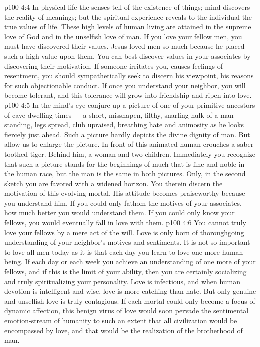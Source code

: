 \vs p100 4:4 \pc In physical life the senses tell of the existence of things; mind discovers the reality of meanings; but the spiritual experience reveals to the individual the true values of life. These high levels of human living are attained in the supreme love of God and in the unselfish love of man. If you love your fellow men, you must have discovered their values. Jesus loved men so much because he placed such a high value upon them. You can best discover values in your associates by discovering their motivation. If someone irritates you, causes feelings of resentment, you should sympathetically seek to discern his viewpoint, his reasons for such objectionable conduct. If once you understand your neighbor, you will become tolerant, and this tolerance will grow into friendship and ripen into love.
\vs p100 4:5 In the mind’s eye conjure up a picture of one of your primitive ancestors of cave\hyp{}dwelling times --- a short, misshapen, filthy, snarling hulk of a man standing, legs spread, club upraised, breathing hate and animosity as he looks fiercely just ahead. Such a picture hardly depicts the divine dignity of man. But allow us to enlarge the picture. In front of this animated human crouches a saber\hyp{}toothed tiger. Behind him, a woman and two children. Immediately you recognize that such a picture stands for the beginnings of much that is fine and noble in the human race, but the man is the same in both pictures. Only, in the second sketch you are favored with a widened horizon. You therein discern the motivation of this evolving mortal. His attitude becomes praiseworthy because you understand him. If you could only fathom the motives of your associates, how much better you would understand them. If you could only know your fellows, you would eventually fall in love with them.
\vs p100 4:6 You cannot truly love your fellows by a mere act of the will. Love is only born of thoroughgoing understanding of your neighbor’s motives and sentiments. It is not so important to love all men today as it is that each day you learn to love one more human being. If each day or each week you achieve an understanding of one more of your fellows, and if this is the limit of your ability, then you are certainly socializing and truly spiritualizing your personality. Love is infectious, and when human devotion is intelligent and wise, love is more catching than hate. But only genuine and unselfish love is truly contagious. If each mortal could only become a focus of dynamic affection, this benign virus of love would soon pervade the sentimental emotion\hyp{}stream of humanity to such an extent that all civilization would be encompassed by love, and that would be the realization of the brotherhood of man.
